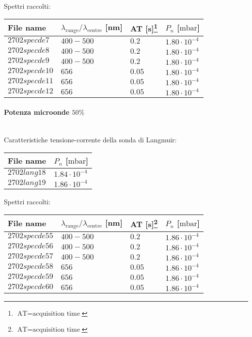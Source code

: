 Spettri raccolti:
\begin{center}
\begin{tabular}{p{3cm}p{4cm}p{2cm}p{3cm}}
\toprule
File name	&$\lambda_\text{range}\text{/}\lambda_\text{centre}$ [nm] 	&AT [s]\footnote{$\text{AT}=\text{acquisition time}$} &$P_n$ [$\si{\milli\bar}$]\\
\midrule
$2702specde7$	&$400-500$	&$0.2$		&$1.80\cdot10^{-4}$\\
$2702specde8$	&$400-500$	&$0.2$		&$1.80\cdot10^{-4}$\\
$2702specde9$	&$400-500$	&$0.2$		&$1.80\cdot10^{-4}$\\
$2702specde10$	&$656$		&$0.05$		&$1.80\cdot10^{-4}$\\
$2702specde11$	&$656$		&$0.05$		&$1.80\cdot10^{-4}$\\
$2702specde12$	&$656$		&$0.05$		&$1.80\cdot10^{-4}$\\
\bottomrule
\end{tabular}
\end{center}

\paragraph*{Potenza microonde $\text{50\%}$} ~\\
Caratteristiche tensione-corrente della sonda di Langmuir:
\begin{center}
\begin{tabular}{p{3cm}p{3cm}}
\toprule
File name	&$P_n$ [$\si{\milli\bar}$]\\
\midrule
$2702lang18$	&$1.84\cdot10^{-4}$\\
$2702lang19$	&$1.86\cdot10^{-4}$\\
\bottomrule
\end{tabular}
\end{center}

Spettri raccolti:
\begin{center}
\begin{tabular}{p{3cm}p{4cm}p{2cm}p{3cm}}
\toprule
File name	&$\lambda_\text{range}\text{/}\lambda_\text{centre}$ [nm] 	&AT [s]\footnote{$\text{AT}=\text{acquisition time}$} &$P_n$ [$\si{\milli\bar}$]\\
\midrule
$2702specde55$	&$400-500$	&$0.2$		&$1.86\cdot10^{-4}$\\
$2702specde56$	&$400-500$	&$0.2$		&$1.86\cdot10^{-4}$\\
$2702specde57$	&$400-500$	&$0.2$		&$1.86\cdot10^{-4}$\\
$2702specde58$	&$656$		&$0.05$		&$1.86\cdot10^{-4}$\\
$2702specde59$	&$656$		&$0.05$		&$1.86\cdot10^{-4}$\\
$2702specde60$	&$656$		&$0.05$		&$1.86\cdot10^{-4}$\\
\bottomrule
\end{tabular}
\end{center}

